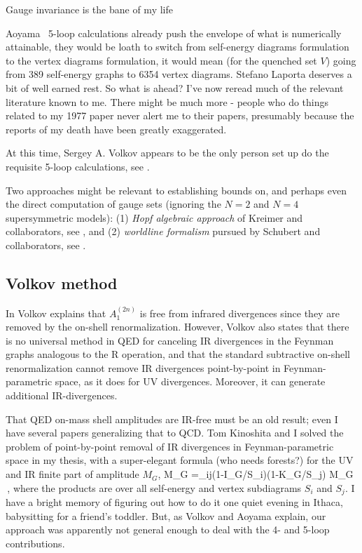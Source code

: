 \begin{bartlett}{
{Gauge invariance is the bane of my life}
        }
\end{bartlett}
\bigskip

\noindent
Aoyama \etal\ 5-loop calculations already push the envelope of what is
numerically attainable, they would be loath to switch from self-energy
diagrams formulation to the vertex diagrams formulation, it would mean
(for the quenched set $V$) going from 389 self-energy graphs to 6354
vertex diagrams. Stefano Laporta deserves a bit of well earned rest. So
what is ahead?
I've now reread much of the relevant literature known to me. There might
be much more - people who do things related to my 1977 paper
never alert me to their papers, presumably because the reports of my
death have been greatly exaggerated.

At this time, Sergey  A. Volkov appears to be the
only person set up do the requisite 5-loop calculations,
see .

Two approaches might be relevant to
establishing bounds on, and perhaps even the direct computation
of gauge sets (ignoring the $N\!=\!2$ and $N\!=\!4$
supersymmetric models):
(1) \emph{Hopf algebraic approach} of Kreimer and collaborators,
see ,
and
(2)
\emph{worldline formalism} pursued by
{Schubert} and collaborators,
see .

\subsection{Volkov method}
\label{sect:Volkov}

In  Volkov explains that $A_1^{(2n)}$ is free from
infrared divergences since they are removed by the on-shell
renormalization.
However, Volkov also states that there is no universal method in QED for
canceling IR divergences in the Feynman graphs analogous to the R
operation, and that the standard subtractive on-shell renormalization
cannot remove IR divergences point-by-point in Feynman-parametric space,
as it does for UV divergences. Moreover, it can generate additional
IR-divergences.

That QED on-mass shell amplitudes are IR-free must be an old result; even
I have several papers generalizing that to
QCD. Tom Kinoshita and I solved
the problem of point-by-point removal of IR divergences in
Feynman-parametric space in my thesis, with a
super-elegant formula (who needs forests?) for the UV and IR finite part
of amplitude $M_G$,
\beq
\Delta M_G =\prod_{ij}(1-I_{G/S_i})(1-K_{G/S_j}) M_G
\,,
where the products are over all self-energy and vertex subdiagrams $S_i$
and $S_j$.
I have a bright memory of figuring out how to do it one quiet evening in
Ithaca, babysitting for a friend's toddler. But, as Volkov
and Aoyama \etal{} explain, our approach was apparently
not general enough to deal with the 4- and 5-loop contributions.

